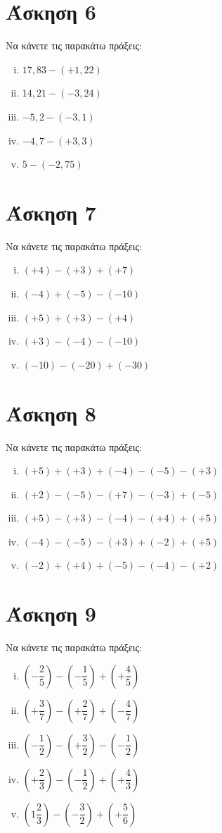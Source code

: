 \documentclass[a4paper,10pt]{report}
\begin{document}
\section*{Άσκηση 6  \hfill \small{}}%
Να κάνετε τις παρακάτω πράξεις:
\begin{enumerate}[i)]
\item $17,83-(+1,22)$
\item $14,21-(-3,24)$
\item $-5,2-(-3,1)$
\item $-4,7-(+3,3)$
\item $5-(-2,75)$
\end{enumerate}


\section*{Άσκηση 7  \hfill \small{}}%
Να κάνετε τις παρακάτω πράξεις:
\begin{enumerate}[i)]
\item $(+4)-(+3)+(+7)$
\item $(-4)+(-5)-(-10)$
\item $(+5)+(+3)-(+4)$
\item $(+3)-(-4)-(-10)$
\item $(-10)-(-20)+(-30)$
\end{enumerate}

\section*{Άσκηση 8  \hfill \small{}}%
Να κάνετε τις παρακάτω πράξεις:
\begin{enumerate}[i)]
\item $(+5)+(+3)+(-4)-(-5)-(+3)$
\item $(+2)-(-5)-(+7)-(-3)+(-5)$
\item $(+5)-(+3)-(-4)-(+4)+(+5)$
\item $(-4)-(-5)-(+3)+(-2)+(+5)$
\item $(-2)+(+4)+(-5)-(-4)-(+2)$
\end{enumerate}

\section*{Άσκηση 9  \hfill \small{}}%
Να κάνετε τις παρακάτω πράξεις:
\begin{enumerate}[i)]
\item $(-\dfrac{2}{5})-(-\dfrac{1}{5})+(+\dfrac{4}{5})$
\item $(+\dfrac{3}{7})-(+\dfrac{2}{7})+(-\dfrac{4}{7})$
\item $(-\dfrac{1}{2})-(+\dfrac{3}{2})-(-\dfrac{1}{2})$
\item $(+\dfrac{2}{3})-(-\dfrac{1}{2})+(+\dfrac{4}{3})$
\item $(1\dfrac{2}{3})-(-\dfrac{3}{2})+(+\dfrac{5}{6})$
\end{enumerate}
\end{document}
